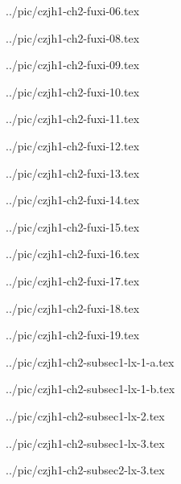 ../pic/czjh1-ch2-fuxi-06.tex



../pic/czjh1-ch2-fuxi-08.tex



../pic/czjh1-ch2-fuxi-09.tex



../pic/czjh1-ch2-fuxi-10.tex



../pic/czjh1-ch2-fuxi-11.tex



../pic/czjh1-ch2-fuxi-12.tex



../pic/czjh1-ch2-fuxi-13.tex



../pic/czjh1-ch2-fuxi-14.tex



../pic/czjh1-ch2-fuxi-15.tex



../pic/czjh1-ch2-fuxi-16.tex



../pic/czjh1-ch2-fuxi-17.tex



../pic/czjh1-ch2-fuxi-18.tex



../pic/czjh1-ch2-fuxi-19.tex



../pic/czjh1-ch2-subsec1-lx-1-a.tex



../pic/czjh1-ch2-subsec1-lx-1-b.tex



../pic/czjh1-ch2-subsec1-lx-2.tex



../pic/czjh1-ch2-subsec1-lx-3.tex



../pic/czjh1-ch2-subsec2-lx-3.tex

